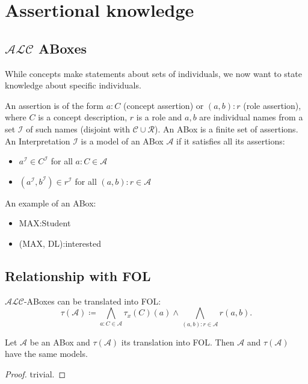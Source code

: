 \section{Assertional knowledge}
\subsection{$\mathcal{ALC}$ ABoxes}
While concepts make statements about sets of individuals, we now want to state knowledge about specific individuals.

\begin{definition}
	An assertion is of the form $a:C$ (concept assertion) or $(a,b):r$ (role assertion),
	where $C$ is a concept description, $r$ is a role and $a,b$ are individual names from a set $\mathscr{I}$ of such names (disjoint with $\mathscr{C} \cup \mathscr{R}$).
	An ABox is a finite set of assertions.
	An Interpretation $\mathcal{I}$ is a model of an ABox $\mathcal{A}$ if it satisfies all its assertions:
	\begin{itemize}
		\item $a^{\mathcal{I}} \in C^{\mathcal{I}}$ for all $a:C \in \mathcal{A}$ 
		\item $(a^{\mathcal{I}}, b^{\mathcal{I}}) \in r^{\mathcal{I}}$ for all $(a,b):r \in \mathcal{A}$
	\end{itemize}
\end{definition}

\begin{example}
	An example of an ABox:
	\begin{itemize}
		\item MAX:Student
		\item (MAX, DL):interested
	\end{itemize}
\end{example}

\subsection{Relationship with FOL}
$\mathcal{ALC}$-ABoxes can be translated into FOL:
\[
	\tau(\mathcal{A}) \coloneqq \bigwedge_{a:C \in \mathcal{A}} \tau_{x}(C)(a) \land \bigwedge_{(a,b):r \in \mathcal{A}} r(a,b)
.\]

\begin{lemma}
	Let $\mathcal{A}$ be an ABox and $\tau(\mathcal{A})$ its translation into FOL.
	Then $\mathcal{A}$ and $\tau (\mathcal{A})$ have the same models.
\end{lemma}
\begin{proof}
	trivial.
\end{proof}

